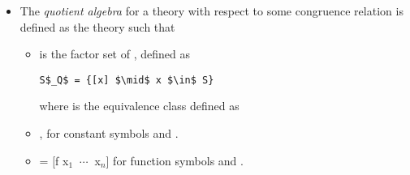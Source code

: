 \begin{itemize}
    \item The \emph{quotient algebra} for a theory  with respect to some congruence relation \lstmath{$\equiv$} is defined as the theory  such that 
    \begin{itemize}
       \item {} is the factor set of , defined as 
       	\begin{lstlisting}[mathescape]
       	S$_Q$ = {[x] $\mid$ x $\in$ S}
       	\end{lstlisting} 
       	where \lstmath{[x]} is the equivalence class defined as 
       \item {}, for constant symbols  and .  
       \item {} = [f x$_1$ $\ \cdots\ $ x$_n$]
       for function symbols  and .
    \end{itemize}      


\end{itemize}
